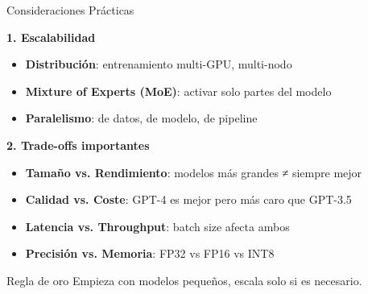 \begin{frame}{Consideraciones Prácticas}

\textbf{1. Escalabilidad}
\begin{itemize}
    \item \textbf{Distribución}: entrenamiento multi-GPU, multi-nodo
    \item \textbf{Mixture of Experts (MoE)}: activar solo partes del modelo
    \item \textbf{Paralelismo}: de datos, de modelo, de pipeline
\end{itemize}

\vspace{0.5em}

\textbf{2. Trade-offs importantes}
\begin{itemize}
    \item \textbf{Tamaño vs. Rendimiento}: modelos más grandes ≠ siempre mejor
    \item \textbf{Calidad vs. Coste}: GPT-4 es mejor pero más caro que GPT-3.5
    \item \textbf{Latencia vs. Throughput}: batch size afecta ambos
    \item \textbf{Precisión vs. Memoria}: FP32 vs FP16 vs INT8
\end{itemize}

\vspace{0.5em}

\begin{alertblock}{Regla de oro}
Empieza con modelos pequeños, escala solo si es necesario.
\end{alertblock}

\end{frame}


